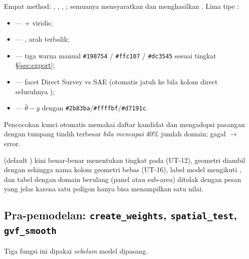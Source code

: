 Empat method: , , ,
; semuanya mensyaratkan  dan menghasilkan
. Lima tipe :
\begin{itemize}
  \item {} ---  + viridis;
  \item {} --- , arah terbalik;
  \item {} --- tiga warna manual
        \texttt{\#198754} / \texttt{\#ffc107} / \texttt{\#dc3545}
        sesuai tingkat \S\ref{sec:export};
  \item {} --- facet Direct Survey vs SAE (otomatis jatuh ke
         bila kolom direct seluruhnya );
  \item {} --- $\hat\theta-y$ dengan 
        \texttt{\#2b83ba}/\texttt{\#ffffbf}/\texttt{\#d7191c}.
\end{itemize}
Pencocokan kunci otomatis memakai daftar kandidat
 dan mengadopsi pasangan dengan tumpang tindih terbesar
\emph{bila mencapai} $40\%$ jumlah domain; gagal $\to$ error.

 (default ) kini benar-benar menentukan
tingkat pada  (UT-12), geometri diambil dengan
 sehingga nama kolom geometri bebas (UT-16), label
model mengikuti , dan tabel dengan domain berulang (panel
atau sub-area) ditolak dengan pesan yang jelas karena satu poligon hanya bisa
menampilkan satu nilai.

\subsection{Pra-pemodelan: \texttt{create\_weights}, \texttt{spatial\_test}, \texttt{gvf\_smooth}}\label{sec:pra-model}

Tiga fungsi ini dipakai \emph{sebelum} model dipasang.

